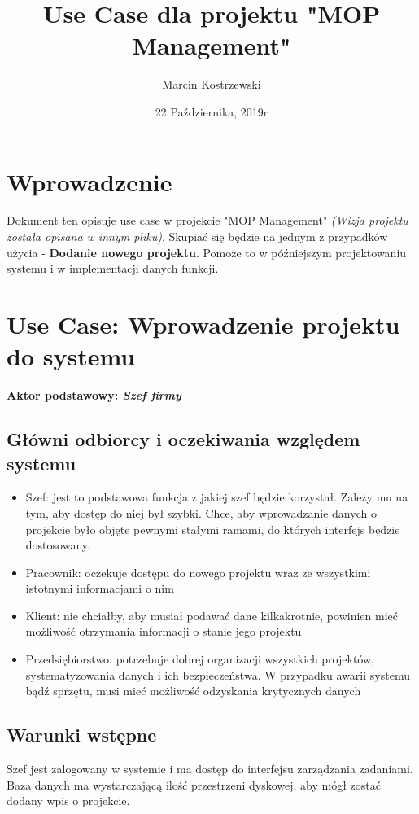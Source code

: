 \documentclass{article}
\title{Use Case dla projektu "MOP Management"}
\author{Marcin Kostrzewski}
\date{22 Października, 2019r}
\begin{document}
\maketitle
\newpage
\tableofcontents
\newpage

\section{Wprowadzenie}
Dokument ten opisuje use case w projekcie "MOP Management" \textit{(Wizja projektu została opisana w innym pliku)}.
Skupiać się będzie na jednym z przypadków użycia - \textbf{Dodanie nowego projektu}.
Pomoże to w późniejszym projektowaniu systemu i w implementacji danych funkcji.

\section{Use Case: Wprowadzenie projektu do systemu}
\textbf{Aktor podstawowy: \textit{Szef firmy}}

\subsection{Główni odbiorcy i oczekiwania względem systemu}
\begin{itemize}
    \item Szef: jest to podstawowa funkcja z jakiej szef będzie korzystał. Zależy mu na tym, aby dostęp do niej był szybki. Chce, aby wprowadzanie danych o projekcie było objęte pewnymi stałymi ramami, do których interfejs będzie dostosowany.
    \item Pracownik: oczekuje dostępu do nowego projektu wraz ze wszystkimi istotnymi informacjami o nim
    \item Klient: nie chciałby, aby musiał podawać dane kilkakrotnie, powinien mieć możliwość otrzymania informacji o stanie jego projektu
    \item Przedsiębiorstwo: potrzebuje dobrej organizacji wszystkich projektów, systematyzowania danych i ich bezpieczeństwa. W przypadku awarii systemu bądź sprzętu, musi mieć możliwość odzyskania krytycznych danych
\end{itemize}

\subsection{Warunki wstępne}
Szef jest zalogowany w systemie i ma dostęp do interfejsu zarządzania zadaniami. Baza danych ma wystarczającą ilość przestrzeni
dyskowej, aby mógł zostać dodany wpis o projekcie.
\end{document}
